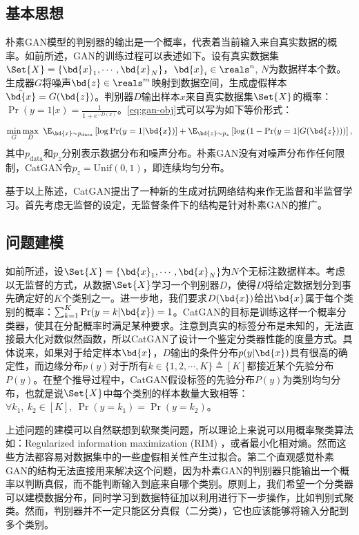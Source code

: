 \subsection{基本思想}
朴素GAN模型的判别器的输出是一个概率，代表着当前输入来自真实数据的概率。如前所述，GAN的训练过程可以表述如下。设有真实数据集$\Set{X} = \{\bd{x}_1, \cdots, \bd{x}_N\}$，$\bd{x}_i \in \reals^n$, $N$为数据样本个数。生成器$G$将噪声$\bd{z}\in \reals^m$映射到数据空间，生成虚假样本$\tilde{\bd{x}} = G(\bd{z})$。判别器$D$输出样本$x$来自真实数据集$\Set{X}$的概率：$\Pr(y=1 | x) = \frac{1}{1 + e^{-D(x)}}$。\eqref{eq:gan-obj}式可以写为如下等价形式：
\begin{equation}
  \min_G\max_D ~\E_{\bd{x} \sim p_{\text{data}}} \left[ \log \Pr(y=1|\bd{x}) \right]
  + \E_{\bd{z} \sim p_z} \left[ \log\left( 1 - \Pr(y=1|G(\bd{z})) \right) \right],
\end{equation}
其中$p_{\text{data}}$和$p_z$分别表示数据分布和噪声分布。朴素GAN没有对噪声分布作任何限制，CatGAN令$p_z = \text{Unif}(0,1)$，即连续均匀分布。

基于以上陈述，CatGAN提出了一种新的生成对抗网络结构来作无监督和半监督学习。首先考虑无监督的设定，无监督条件下的结构是针对朴素GAN的推广。

\subsection{问题建模}\label{sec:catgan-ps}
如前所述，设$\Set{X} = \{\bd{x}_1, \cdots, \bd{x}_N\}$为$N$个无标注数据样本。考虑以无监督的方式，从数据$\Set{X}$学习一个判别器$D$，使得$D$将给定数据划分到事先确定好的$K$个类别之一。进一步地，我们要求$D(\bd{x})$给出$\bd{x}$属于每个类别的概率：$\sum_{k=1}^K \Pr(y=k|\bd{x}) = 1$。CatGAN的目标是训练这样一个概率分类器，使其在分配概率时满足某种要求。注意到真实的标签分布是未知的，无法直接最大化对数似然函数，所以CatGAN了设计一个鉴定分类器性能的度量方式。具体说来，如果对于给定样本$\bd{x}$，$D$输出的条件分布$p(y|\bd{x})$具有很高的确定性，而边缘分布$p(y)$对于所有$k \in \{1,2,\cdots,K\} \triangleq [K]$都接近某个先验分布$P(y)$。在整个推导过程中，CatGAN假设标签的先验分布$P(y)$为类别均匀分布，也就是说$\Set{X}$中每个类别的样本数量大致相等：$\forall k_1, ~k_2 \in [K], ~\Pr(y=k_1) = \Pr(y=k_2)$。

上述问题的建模可以自然联想到软聚类问题，所以理论上来说可以用概率聚类算法如：Regularized information maximization (RIM) \citep{krause2010discriminative}，或者最小化相对熵\citep{grandvalet2005semi}。然而这些方法都容易对数据集中的一些虚假相关性产生过拟合。第二个直观感觉朴素GAN的结构无法直接用来解决这个问题，因为朴素GAN的判别器只能输出一个概率以判断真假，而不能判断输入到底来自哪个类别。原则上，我们希望一个分类器可以建模数据分布，同时学习到数据特征加以利用进行下一步操作，比如判别式聚类。然而，判别器并不一定只能区分真假（二分类），它也应该能够将输入分配到多个类别。

